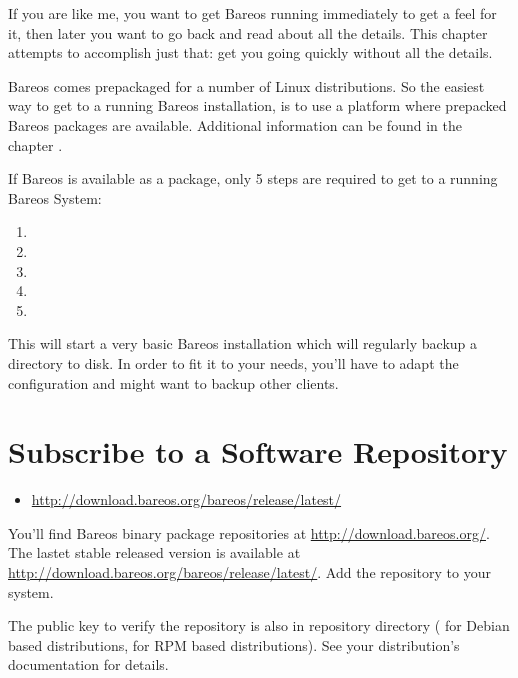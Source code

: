 If you are like me, you want to get Bareos running immediately to get a feel
for it, then later you want to go back and read about all the details. This
chapter attempts to accomplish just that: get you going quickly without all
the details.

Bareos comes prepackaged for a number of Linux distributions.
So the easiest way to get to a running Bareos installation, 
is to use a platform where prepacked Bareos packages are available.
Additional information can be found in the chapter .


If Bareos is available as a package, 
only 5 steps are required to get to a running Bareos System:
\begin{enumerate}
    \item {}
    \item {}
    \item {}
    \item {}
    \item {}
\end{enumerate}

This will start a very basic Bareos installation which will regularly backup a directory to disk.
In order to fit it to your needs, you'll have to adapt the configuration and might want to backup other clients.

\section{Subscribe to a Software Repository}
    \label{sec:AddSoftwareRepository}

\begin{itemize}
   \item \url{http://download.bareos.org/bareos/release/latest/}
\end{itemize}

You'll find Bareos binary package repositories at \url{http://download.bareos.org/}.
The lastet stable released version is available at \url{http://download.bareos.org/bareos/release/latest/}.
Add the repository to your system.

The public key to verify the repository is also in repository directory
( for Debian based distributions,  for RPM based distributions).
See your distribution's documentation for details.


